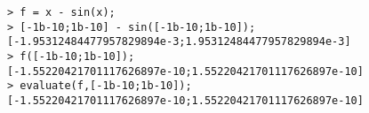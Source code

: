 \begin{center}\begin{minipage}{15cm}\begin{Verbatim}[frame=single]
> f = x - sin(x);
> [-1b-10;1b-10] - sin([-1b-10;1b-10]);
[-1.95312484477957829894e-3;1.95312484477957829894e-3]
> f([-1b-10;1b-10]);
[-1.55220421701117626897e-10;1.55220421701117626897e-10]
> evaluate(f,[-1b-10;1b-10]);
[-1.55220421701117626897e-10;1.55220421701117626897e-10]
\end{Verbatim}
\end{minipage}\end{center}
